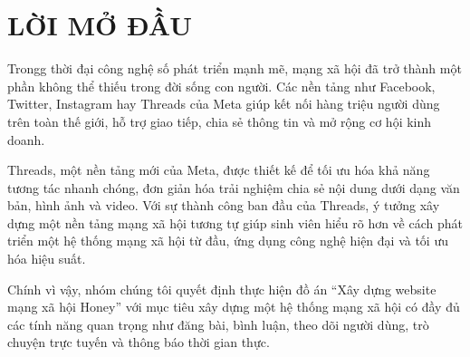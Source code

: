 
\newpage



\section{\textbf{LỜI MỞ ĐẦU}
}
Trongg thời đại công nghệ số phát triển mạnh mẽ, mạng xã hội đã trở thành một phần không thể thiếu trong đời sống con người. Các nền tảng như Facebook, Twitter, Instagram hay Threads của Meta giúp kết nối hàng triệu người dùng trên toàn thế giới, hỗ trợ giao tiếp, chia sẻ thông tin và mở rộng cơ hội kinh doanh.

Threads, một nền tảng mới của Meta, được thiết kế để tối ưu hóa khả năng tương tác nhanh chóng, đơn giản hóa trải nghiệm chia sẻ nội dung dưới dạng văn bản, hình ảnh và video. Với sự thành công ban đầu của Threads, ý tưởng xây dựng một nền tảng mạng xã hội tương tự giúp sinh viên hiểu rõ hơn về cách phát triển một hệ thống mạng xã hội từ đầu, ứng dụng công nghệ hiện đại và tối ưu hóa hiệu suất.

Chính vì vậy, nhóm chúng tôi quyết định thực hiện đồ án “Xây dựng website mạng xã hội Honey” với mục tiêu xây dựng một hệ thống mạng xã hội có đầy đủ các tính năng quan trọng như đăng bài, bình luận, theo dõi người dùng, trò chuyện trực tuyến và thông báo thời gian thực.